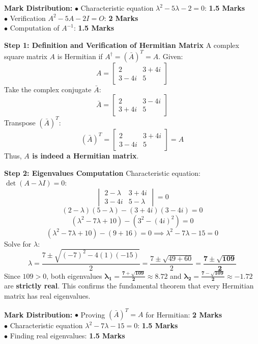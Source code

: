 \begin{solutionbox}
\begin{markingrubric}
\textbf{Mark Distribution:}
$\bullet$ Characteristic equation $\lambda^2 - 5\lambda - 2 = 0$: \textbf{1.5 Marks}\\
$\bullet$ Verification $A^2 - 5A - 2I = O$: \textbf{2 Marks}\\
$\bullet$ Computation of $A^{-1}$: \textbf{1.5 Marks}
\end{markingrubric}
\end{solutionbox}

\begin{solutionbox}
\textbf{Step 1: Definition and Verification of Hermitian Matrix}
A complex square matrix $A$ is Hermitian if $A^\dagger = (\bar{A})^T = A$.
Given:
\[
A = \begin{bmatrix} 2 & 3+4i \\ 3-4i & 5 \end{bmatrix}
\]
Take the complex conjugate $\bar{A}$:
\[
\bar{A} = \begin{bmatrix} 2 & 3-4i \\ 3+4i & 5 \end{bmatrix}
\]
Transpose $(\bar{A})^T$:
\[
(\bar{A})^T = \begin{bmatrix} 2 & 3+4i \\ 3-4i & 5 \end{bmatrix} = A
\]
Thus, \textbf{$A$ is indeed a Hermitian matrix}.

\textbf{Step 2: Eigenvalues Computation}
Characteristic equation: $\det(A - \lambda I) = 0$:
\[
\begin{vmatrix} 2-\lambda & 3+4i \\ 3-4i & 5-\lambda \end{vmatrix} = 0
\]
\[
(2-\lambda)(5-\lambda) - (3+4i)(3-4i) = 0
\]
\[
(\lambda^2 - 7\lambda + 10) - (3^2 - (4i)^2) = 0
\]
\[
(\lambda^2 - 7\lambda + 10) - (9 + 16) = 0 \implies \lambda^2 - 7\lambda - 15 = 0
\]
Solve for $\lambda$:
\[
\lambda = \frac{7 \pm \sqrt{(-7)^2 - 4(1)(-15)}}{2} = \frac{7 \pm \sqrt{49 + 60}}{2} = \mathbf{\frac{7 \pm \sqrt{109}}{2}}
\]
Since $109 > 0$, both eigenvalues $\mathbf{\lambda_1 = \frac{7 + \sqrt{109}}{2} \approx 8.72}$ and $\mathbf{\lambda_2 = \frac{7 - \sqrt{109}}{2} \approx -1.72}$ are \textbf{strictly real}. This confirms the fundamental theorem that every Hermitian matrix has real eigenvalues.

\begin{markingrubric}
\textbf{Mark Distribution:}
$\bullet$ Proving $(\bar{A})^T = A$ for Hermitian: \textbf{2 Marks}\\
$\bullet$ Characteristic equation $\lambda^2 - 7\lambda - 15 = 0$: \textbf{1.5 Marks}\\
$\bullet$ Finding real eigenvalues: \textbf{1.5 Marks}
\end{markingrubric}
\end{solutionbox}

